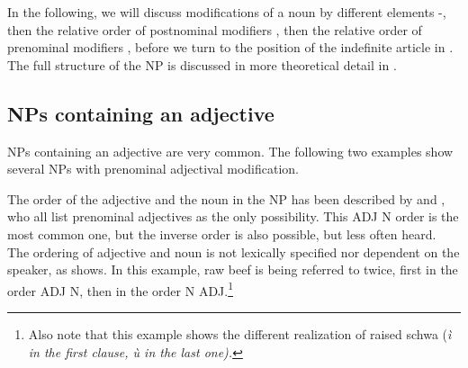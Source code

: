 In the following, we will discuss modifications of a noun by different elements -, then the relative order of postnominal modifiers , then the relative order of prenominal modifiers , before we turn to the position of the indefinite article in . The full structure of the NP is discussed in more theoretical detail in .



\subsection{NPs containing an adjective}\label{sec:nppp:NPscontaininganadjective}

NPs containing an adjective are very common. The following two examples show several NPs with prenominal adjectival modification.




The order of the adjective and the noun in the NP has been described by  \citet{Adelaar1991,Jayasuriya2002,SmithRH} and \citet{Slomanson2006cll}, who all list prenominal adjectives as the only possibility. This ADJ N order is the most common one, but the inverse order is also possible, but less often heard.
The ordering of adjective and noun is not lexically specified nor dependent on the speaker, as  shows. In this example, raw beef is being referred to twice, first in the order ADJ N, then in the order N ADJ.\footnote{Also note that this example shows the different realization of raised schwa (\em ì \em in the first clause, \em ù \em in the last one).}

